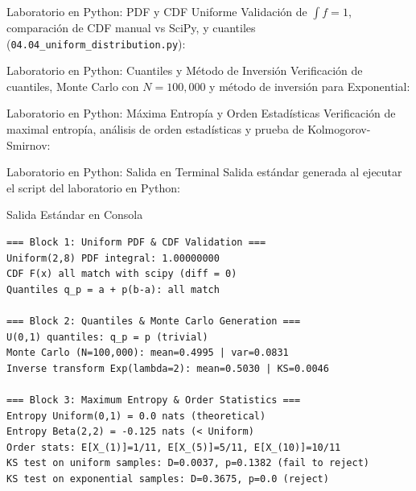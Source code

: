\documentclass[10pt, aspectratio=169]{beamer}
\begin{document}
\begin{frame}[fragile]{Laboratorio en Python: PDF y CDF Uniforme}
  \scriptsize
  Validación de $\int f = 1$, comparación de CDF manual vs SciPy, y cuantiles (\texttt{04.04\_uniform\_distribution.py}):
  \vspace{0.02cm}
  {
  }
\end{frame}

\begin{frame}[fragile]{Laboratorio en Python: Cuantiles y Método de Inversión}
  \scriptsize
  Verificación de cuantiles, Monte Carlo con $N=100{,}000$ y método de inversión para Exponential:
  \vspace{0.02cm}
  {
  }
\end{frame}

\begin{frame}[fragile]{Laboratorio en Python: Máxima Entropía y Orden Estadísticas}
  \scriptsize
  Verificación de maximal entropía, análisis de orden estadísticas y prueba de Kolmogorov-Smirnov:
  \vspace{0.02cm}
  {
  }
\end{frame}

\begin{frame}[fragile]{Laboratorio en Python: Salida en Terminal}
  \scriptsize
  Salida estándar generada al ejecutar el script del laboratorio en Python:
  \vspace{0.02cm}
  \begin{block}{Salida Estándar en Consola}
    \fontsize{4pt}{5pt}\selectfont
    \begin{verbatim}
=== Block 1: Uniform PDF & CDF Validation ===
Uniform(2,8) PDF integral: 1.00000000
CDF F(x) all match with scipy (diff = 0)
Quantiles q_p = a + p(b-a): all match

=== Block 2: Quantiles & Monte Carlo Generation ===
U(0,1) quantiles: q_p = p (trivial)
Monte Carlo (N=100,000): mean=0.4995 | var=0.0831
Inverse transform Exp(lambda=2): mean=0.5030 | KS=0.0046

=== Block 3: Maximum Entropy & Order Statistics ===
Entropy Uniform(0,1) = 0.0 nats (theoretical)
Entropy Beta(2,2) = -0.125 nats (< Uniform)
Order stats: E[X_(1)]=1/11, E[X_(5)]=5/11, E[X_(10)]=10/11
KS test on uniform samples: D=0.0037, p=0.1382 (fail to reject)
KS test on exponential samples: D=0.3675, p=0.0 (reject)
    \end{verbatim}
  \end{block}
\end{frame}
\end{document}
